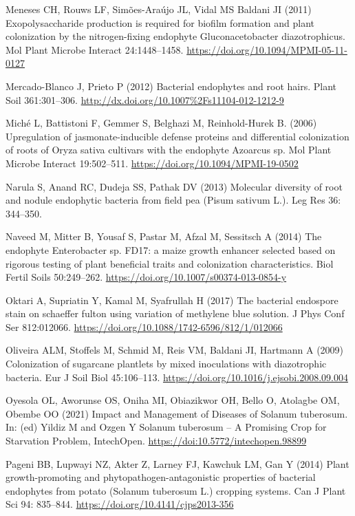 \documentclass[sn-mathphys,Numbered]{sn-jnl}%
\theoremstyle{thmstyleone}%
\theoremstyle{thmstyletwo}%
\theoremstyle{thmstylethree}%
\begin{document}
Meneses CH, Rouws LF, Simões-Araújo JL, Vidal MS Baldani JI (2011) Exopolysaccharide production is required for biofilm formation and plant colonization by the nitrogen-fixing endophyte Gluconacetobacter diazotrophicus. Mol Plant Microbe Interact 24:1448–1458. \url{https://doi.org/10.1094/MPMI-05-11-0127}

Mercado-Blanco J, Prieto P (2012) Bacterial endophytes and root hairs. Plant Soil 361:301–306. \url{http://dx.doi.org/10.1007%2Fs11104-012-1212-9}

Miché L, Battistoni F, Gemmer S, Belghazi M, Reinhold-Hurek B. (2006) Upregulation of jasmonate-inducible defense proteins and differential colonization of roots of Oryza sativa cultivars with the endophyte Azoarcus sp. Mol Plant Microbe Interact 19:502–511. \url{https://doi.org/10.1094/MPMI-19-0502}

Narula S, Anand RC, Dudeja SS, Pathak DV (2013) Molecular diversity of root and nodule endophytic bacteria from field pea (Pisum sativum L.). Leg Res 36: 344–350.

Naveed M, Mitter B, Yousaf S, Pastar M, Afzal M, Sessitsch A (2014) The endophyte Enterobacter sp. FD17: a maize growth enhancer selected based on rigorous testing of plant beneficial traits and colonization characteristics. Biol Fertil Soils 50:249–262. \url{https://doi.org/10.1007/s00374-013-0854-y}

Oktari A, Supriatin Y, Kamal M, Syafrullah H (2017) The bacterial endospore stain on schaeffer fulton using variation of methylene blue solution. J Phys Conf Ser 812:012066. \url{https://doi.org/10.1088/1742-6596/812/1/012066}

Oliveira ALM, Stoffels M, Schmid M, Reis VM, Baldani JI, Hartmann A (2009) Colonization of sugarcane plantlets by mixed inoculations with diazotrophic bacteria. Eur J Soil Biol 45:106–113. \url{https://doi.org/10.1016/j.ejsobi.2008.09.004}

Oyesola OL, Aworunse OS, Oniha MI, Obiazikwor OH, Bello O, Atolagbe OM, Obembe OO (2021) Impact and Management of Diseases of Solanum tuberosum. In: (ed) Yildiz M and Ozgen Y Solanum tuberosum – A Promising Crop for Starvation Problem, IntechOpen. \url{https://doi:10.5772/intechopen.98899}

Pageni BB, Lupwayi NZ, Akter Z, Larney FJ, Kawchuk LM, Gan Y (2014) Plant growth-promoting and phytopathogen-antagonistic properties of bacterial endophytes from potato (Solanum tuberosum L.) cropping systems. Can J Plant Sci 94: 835–844. \url{https://doi.org/10.4141/cjps2013-356}
\end{document}

